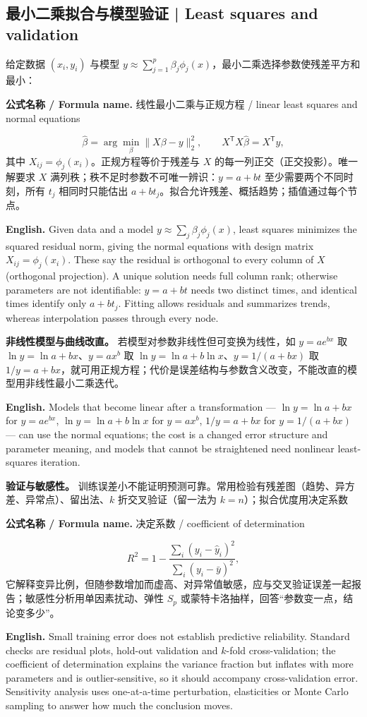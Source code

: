 \documentclass[UTF8,11pt,a4paper]{ctexart}
\newcommand{\EN}[1]{\par\noindent\textbf{English.} #1\par}
\newcommand{\FORMULA}[2]{\par\noindent\textbf{公式名称 / Formula name.} #1 / #2\par}
\begin{document}
\subsection{最小二乘拟合与模型验证 | Least squares and validation}
给定数据 $(x_i,y_i)$ 与模型 $y\approx\sum_{j=1}^p\beta_j\phi_j(x)$，最小二乘选择参数使残差平方和最小：
\FORMULA{线性最小二乘与正规方程}{linear least squares and normal equations}
\[
\hat\beta=\arg\min_\beta\|X\beta-y\|_2^2,\qquad X^{\mathsf T}X\hat\beta=X^{\mathsf T}y ,
\]
其中 $X_{ij}=\phi_j(x_i)$。正规方程等价于残差与 $X$ 的每一列正交（正交投影）。唯一解要求 $X$ 满列秩；秩不足时参数不可唯一辨识：$y=a+bt$ 至少需要两个不同时刻，所有 $t_j$ 相同时只能估出 $a+bt_j$。拟合允许残差、概括趋势；插值通过每个节点。
\EN{Given data and a model $y\approx\sum_j\beta_j\phi_j(x)$, least squares minimizes the squared residual norm, giving the normal equations with design matrix $X_{ij}=\phi_j(x_i)$. These say the residual is orthogonal to every column of $X$ (orthogonal projection). A unique solution needs full column rank; otherwise parameters are not identifiable: $y=a+bt$ needs two distinct times, and identical times identify only $a+bt_j$. Fitting allows residuals and summarizes trends, whereas interpolation passes through every node.}
\noindent\textbf{非线性模型与曲线改直。} 若模型对参数非线性但可变换为线性，如 $y=ae^{bx}$ 取 $\ln y=\ln a+bx$、$y=ax^b$ 取 $\ln y=\ln a+b\ln x$、$y=1/(a+bx)$ 取 $1/y=a+bx$，就可用正规方程；代价是误差结构与参数含义改变，不能改直的模型用非线性最小二乘迭代。
\EN{Models that become linear after a transformation — $\ln y=\ln a+bx$ for $y=ae^{bx}$, $\ln y=\ln a+b\ln x$ for $y=ax^b$, $1/y=a+bx$ for $y=1/(a+bx)$ — can use the normal equations; the cost is a changed error structure and parameter meaning, and models that cannot be straightened need nonlinear least-squares iteration.}
\noindent\textbf{验证与敏感性。} 训练误差小不能证明预测可靠。常用检验有残差图（趋势、异方差、异常点）、留出法、$k$ 折交叉验证（留一法为 $k=n$）；拟合优度用决定系数
\FORMULA{决定系数}{coefficient of determination}
\[
R^2=1-\frac{\sum_i(y_i-\hat y_i)^2}{\sum_i(y_i-\bar y)^2},
\]
它解释变异比例，但随参数增加而虚高、对异常值敏感，应与交叉验证误差一起报告；敏感性分析用单因素扰动、弹性 $S_p$ 或蒙特卡洛抽样，回答“参数变一点，结论变多少”。
\EN{Small training error does not establish predictive reliability. Standard checks are residual plots, hold-out validation and $k$-fold cross-validation; the coefficient of determination explains the variance fraction but inflates with more parameters and is outlier-sensitive, so it should accompany cross-validation error. Sensitivity analysis uses one-at-a-time perturbation, elasticities or Monte Carlo sampling to answer how much the conclusion moves.}
\end{document}
